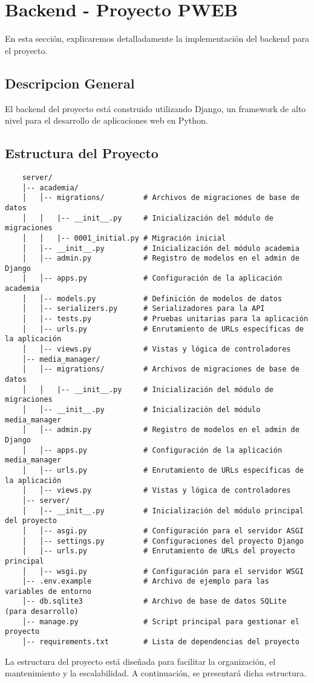 \section*{Backend - Proyecto PWEB}
En esta sección, explicaremos detalladamente la implementación del backend para el proyecto.
\subsection*{Descripcion General}
El backend del proyecto está construido utilizando Django, un framework de alto nivel para el desarrollo de aplicaciones web en Python.
\subsection*{Estructura del Proyecto}
\begin{verbatim}
	server/
	│-- academia/
	│   │-- migrations/         # Archivos de migraciones de base de datos
	│   │   |-- __init__.py     # Inicialización del módulo de migraciones
	│   │   |-- 0001_initial.py # Migración inicial
	│   │-- __init__.py         # Inicialización del módulo academia
	│   │-- admin.py            # Registro de modelos en el admin de Django
	│   │-- apps.py             # Configuración de la aplicación academia
	│   │-- models.py           # Definición de modelos de datos
	│   │-- serializers.py      # Serializadores para la API
	│   │-- tests.py            # Pruebas unitarias para la aplicación
	│   │-- urls.py             # Enrutamiento de URLs específicas de la aplicación
	│   │-- views.py            # Vistas y lógica de controladores
	│-- media_manager/
	│   │-- migrations/         # Archivos de migraciones de base de datos
	│   │   |-- __init__.py     # Inicialización del módulo de migraciones
	│   │-- __init__.py         # Inicialización del módulo media_manager
	│   │-- admin.py            # Registro de modelos en el admin de Django
	│   │-- apps.py             # Configuración de la aplicación media_manager
	│   │-- urls.py             # Enrutamiento de URLs específicas de la aplicación
	│   │-- views.py            # Vistas y lógica de controladores
	│-- server/
	│   │-- __init__.py         # Inicialización del módulo principal del proyecto
	│   │-- asgi.py             # Configuración para el servidor ASGI
	│   │-- settings.py         # Configuraciones del proyecto Django
	│   │-- urls.py             # Enrutamiento de URLs del proyecto principal
	│   │-- wsgi.py             # Configuración para el servidor WSGI
	│-- .env.example            # Archivo de ejemplo para las variables de entorno
	│-- db.sqlite3              # Archivo de base de datos SQLite (para desarrollo)
	│-- manage.py               # Script principal para gestionar el proyecto
	│-- requirements.txt        # Lista de dependencias del proyecto
\end{verbatim}
La estructura del proyecto está diseñada para facilitar la organización, el mantenimiento y la escalabilidad. A continuación, se presentará dicha estructura.
